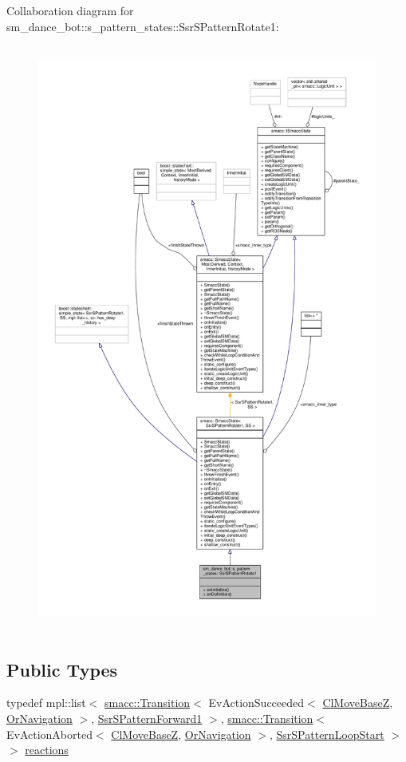 Collaboration diagram for sm\+\_\+dance\+\_\+bot\+:\+:s\+\_\+pattern\+\_\+states\+:\+:Ssr\+S\+Pattern\+Rotate1\+:\nopagebreak
\begin{figure}[H]
\begin{center}
\leavevmode
\includegraphics[height=550pt]{structsm__dance__bot_1_1s__pattern__states_1_1SsrSPatternRotate1__coll__graph}
\end{center}
\end{figure}
\subsection*{Public Types}
\begin{DoxyCompactItemize}
\item 
typedef mpl\+::list$<$ \hyperlink{classsmacc_1_1Transition}{smacc\+::\+Transition}$<$ Ev\+Action\+Succeeded$<$ \hyperlink{classmove__base__z__client_1_1ClMoveBaseZ}{Cl\+Move\+BaseZ}, \hyperlink{classsm__dance__bot_1_1OrNavigation}{Or\+Navigation} $>$, \hyperlink{structsm__dance__bot_1_1s__pattern__states_1_1SsrSPatternForward1}{Ssr\+S\+Pattern\+Forward1} $>$, \hyperlink{classsmacc_1_1Transition}{smacc\+::\+Transition}$<$ Ev\+Action\+Aborted$<$ \hyperlink{classmove__base__z__client_1_1ClMoveBaseZ}{Cl\+Move\+BaseZ}, \hyperlink{classsm__dance__bot_1_1OrNavigation}{Or\+Navigation} $>$, \hyperlink{structsm__dance__bot_1_1s__pattern__states_1_1SsrSPatternLoopStart}{Ssr\+S\+Pattern\+Loop\+Start} $>$ $>$ \hyperlink{structsm__dance__bot_1_1s__pattern__states_1_1SsrSPatternRotate1_a19ca92dae97d24dd856edc8aa90d35e4}{reactions}
\end{DoxyCompactItemize}
